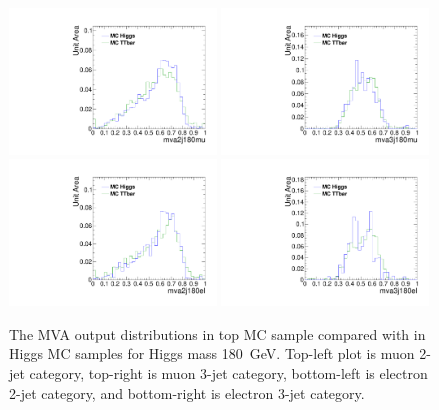\begin{figure}[!t]
  \centering
  \includegraphics[width=0.49\textwidth]{figs/cl-mva2j180mu-mvaTopvsHiggs.pdf}
  \includegraphics[width=0.49\textwidth]{figs/cl-mva3j180mu-mvaTopvsHiggs.pdf}
  \includegraphics[width=0.49\textwidth]{figs/cl-mva2j180el-mvaTopvsHiggs.pdf}
  \includegraphics[width=0.49\textwidth]{figs/cl-mva3j180el-mvaTopvsHiggs.pdf}
  \caption{\label{fig:mva:sigvsttbar-mva2j180}The MVA output
    distributions in top MC sample compared with in Higgs MC
    samples for Higgs mass 180~GeV. Top-left plot is muon 2-jet category,
    top-right is muon 3-jet category, bottom-left is electron 2-jet
    category, and bottom-right is electron 3-jet category. }
\end{figure}

